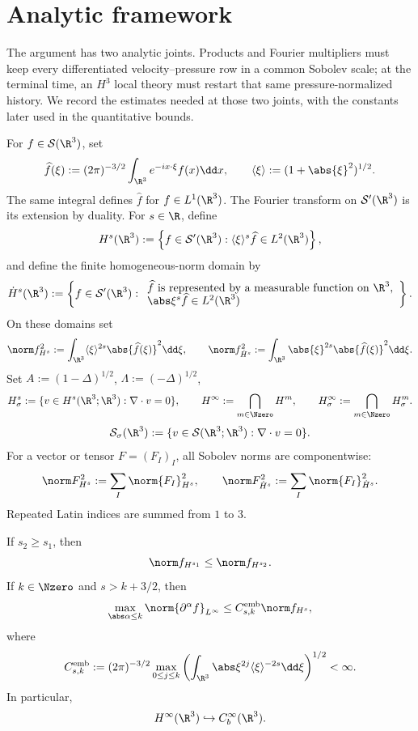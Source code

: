 \section{Analytic framework}

The argument has two analytic joints.  Products and Fourier multipliers must
keep every differentiated velocity--pressure row in a common Sobolev scale;
at the terminal time, an \(H^3\) local theory must restart that same
pressure-normalized history.  We record the estimates needed at those two
joints, with the constants later used in the quantitative bounds.

\begin{definition}
For \(f\in\mathcal S(\R^3)\), set
\[
 \widehat f(\xi):=(2\pi)^{-3/2}\int_{\R^3}e^{-ix\cdot\xi}f(x)\dd x,
 \qquad
 \langle\xi\rangle:=(1+\abs{\xi}^2)^{1/2}.
\]
The same integral defines \(\widehat f\) for \(f\in L^1(\R^3)\).  The
Fourier transform on \(\mathcal S'(\R^3)\) is its extension by duality.
For \(s\in\R\), define
\[
 H^s(\R^3):=
 \left\{f\in\mathcal S'(\R^3):
       \langle\xi\rangle^s\widehat f\in L^2(\R^3)\right\},
\]
and define the finite homogeneous-norm domain by
\[
 \dot H^s(\R^3):=
 \left\{f\in\mathcal S'(\R^3):
 \begin{array}{l}
 \widehat f\text{ is represented by a measurable function on }\R^3,\\[-2pt]
 \abs\xi^s\widehat f\in L^2(\R^3)
 \end{array}
 \right\}.
\]
On these domains set
\[
 \norm f_{H^s}^2:=\int_{\R^3}\langle\xi\rangle^{2s}
 \abs{\widehat f(\xi)}^2\dd\xi,
 \qquad
 \norm f_{\dot H^s}^2:=\int_{\R^3}\abs{\xi}^{2s}
 \abs{\widehat f(\xi)}^2\dd\xi.
\]
Set \(A:=(1-\Delta)^{1/2}\), \(\Lambda:=(-\Delta)^{1/2}\),
\[
 H^s_\sigma:=\{v\in H^s(\R^3;\R^3):\nabla\cdot v=0\},
 \qquad
 H^\infty:=\bigcap_{m\in\Nzero}H^m,
 \qquad
 H^\infty_\sigma:=\bigcap_{m\in\Nzero}H^m_\sigma.
\]
\[
 \mathcal S_\sigma(\R^3):=
 \{v\in\mathcal S(\R^3;\R^3):\nabla\cdot v=0\}.
\]
For a vector or tensor \(F=(F_I)_I\), all Sobolev norms are componentwise:
\[
 \norm F_{H^s}^2:=\sum_I\norm{F_I}_{H^s}^2,
 \qquad
 \norm F_{\dot H^s}^2:=\sum_I\norm{F_I}_{\dot H^s}^2.
\]
Repeated Latin indices are summed from \(1\) to \(3\).
\end{definition}

\begin{lemma}
\label{lem:sobolev-embedding}
If \(s_2\ge s_1\), then
\[
 \norm f_{H^{s_1}}\le\norm f_{H^{s_2}}.
\]
If \(k\in\Nzero\) and \(s>k+3/2\), then
\[
 \max_{\abs\alpha\le k}\norm{\partial^\alpha f}_{L^\infty}
 \le C_{s,k}^{\rm emb}\norm f_{H^s},
\]
where
\[
 C_{s,k}^{\rm emb}:=(2\pi)^{-3/2}
 \max_{0\le j\le k}
 \left(\int_{\R^3}\abs\xi^{2j}\langle\xi\rangle^{-2s}\dd\xi\right)^{1/2}<\infty.
\]
In particular,
\[
 H^\infty(\R^3)\hookrightarrow C_b^\infty(\R^3).
\]
\end{lemma}

